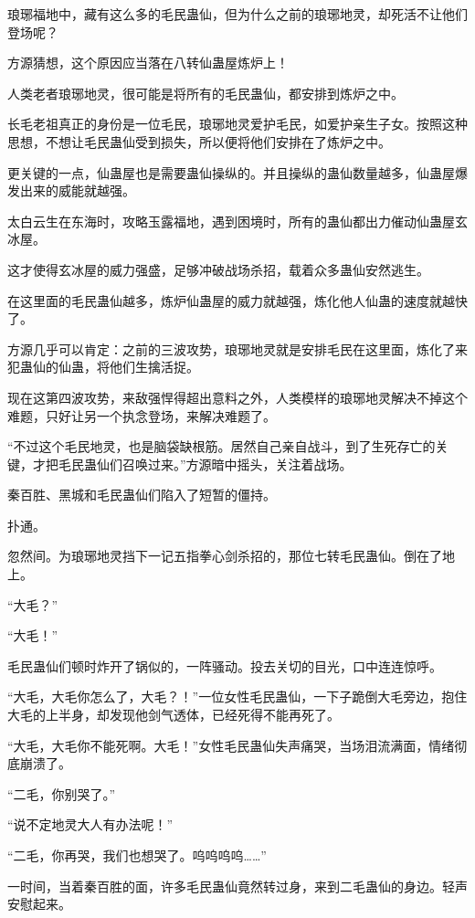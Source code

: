 
\begin{this_body}

琅琊福地中，藏有这么多的毛民蛊仙，但为什么之前的琅琊地灵，却死活不让他们登场呢？

方源猜想，这个原因应当落在八转仙蛊屋炼炉上！

人类老者琅琊地灵，很可能是将所有的毛民蛊仙，都安排到炼炉之中。

长毛老祖真正的身份是一位毛民，琅琊地灵爱护毛民，如爱护亲生子女。按照这种思想，不想让毛民蛊仙受到损失，所以便将他们安排在了炼炉之中。

更关键的一点，仙蛊屋也是需要蛊仙操纵的。并且操纵的蛊仙数量越多，仙蛊屋爆发出来的威能就越强。

太白云生在东海时，攻略玉露福地，遇到困境时，所有的蛊仙都出力催动仙蛊屋玄冰屋。

这才使得玄冰屋的威力强盛，足够冲破战场杀招，载着众多蛊仙安然逃生。

在这里面的毛民蛊仙越多，炼炉仙蛊屋的威力就越强，炼化他人仙蛊的速度就越快了。

方源几乎可以肯定：之前的三波攻势，琅琊地灵就是安排毛民在这里面，炼化了来犯蛊仙的仙蛊，将他们生擒活捉。

现在这第四波攻势，来敌强悍得超出意料之外，人类模样的琅琊地灵解决不掉这个难题，只好让另一个执念登场，来解决难题了。

“不过这个毛民地灵，也是脑袋缺根筋。居然自己亲自战斗，到了生死存亡的关键，才把毛民蛊仙们召唤过来。”方源暗中摇头，关注着战场。

秦百胜、黑城和毛民蛊仙们陷入了短暂的僵持。

扑通。

忽然间。为琅琊地灵挡下一记五指拳心剑杀招的，那位七转毛民蛊仙。倒在了地上。

“大毛？”

“大毛！”

毛民蛊仙们顿时炸开了锅似的，一阵骚动。投去关切的目光，口中连连惊呼。

“大毛，大毛你怎么了，大毛？！”一位女性毛民蛊仙，一下子跪倒大毛旁边，抱住大毛的上半身，却发现他剑气透体，已经死得不能再死了。

“大毛，大毛你不能死啊。大毛！”女性毛民蛊仙失声痛哭，当场泪流满面，情绪彻底崩溃了。

“二毛，你别哭了。”

“说不定地灵大人有办法呢！”

“二毛，你再哭，我们也想哭了。呜呜呜呜……”

一时间，当着秦百胜的面，许多毛民蛊仙竟然转过身，来到二毛蛊仙的身边。轻声安慰起来。


\end{this_body}
